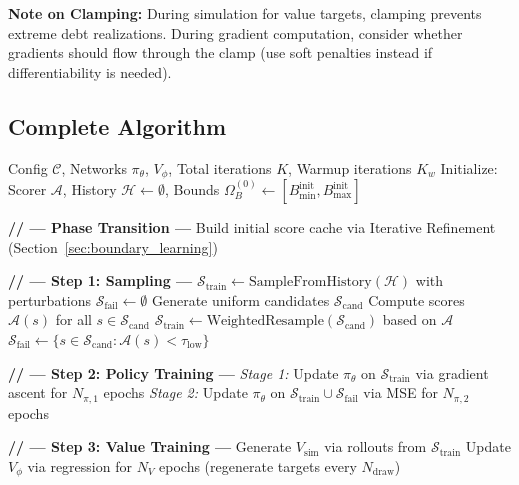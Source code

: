 \textbf{Note on Clamping:} During simulation for value targets, clamping prevents extreme debt realizations. During gradient computation, consider whether gradients should flow through the clamp (use soft penalties instead if differentiability is needed).


\subsection{Complete Algorithm}

\begin{algorithm}[H]
\caption{Deep Ramsey Algorithm with Adaptive Sampling}
\label{alg:main}
\begin{algorithmic}[1]
\Require Config $\mathcal{C}$, Networks $\pi_\theta$, $V_\phi$, Total iterations $K$, Warmup iterations $K_w$
\State Initialize: Scorer $\mathcal{A}$, History $\mathcal{H} \gets \emptyset$, Bounds $\Omega_B^{(0)} \gets [B_{\min}^{\text{init}}, B_{\max}^{\text{init}}]$

    \State \textbf{// --- Phase Transition ---}
        \State Build initial score cache via Iterative Refinement (Section~\ref{sec:boundary_learning})
    \EndIf
    
    \State
    \State \textbf{// --- Step 1: Sampling ---}
     
        \State $\mathcal{S}_{\text{train}} \gets \text{SampleFromHistory}(\mathcal{H})$ with perturbations
        \State $\mathcal{S}_{\text{fail}} \gets \emptyset$
    \Else {}
        \State Generate uniform candidates $\mathcal{S}_{\text{cand}}$
        \State Compute scores $\mathcal{A}(s)$ for all $s \in \mathcal{S}_{\text{cand}}$
        \State $\mathcal{S}_{\text{train}} \gets \text{WeightedResample}(\mathcal{S}_{\text{cand}})$ based on $\mathcal{A}$
        \State $\mathcal{S}_{\text{fail}} \gets \{s \in \mathcal{S}_{\text{cand}} : \mathcal{A}(s) < \tau_{\text{low}}\}$
    \EndIf
    
    \State
    \State \textbf{// --- Step 2: Policy Training ---}
    \State \textit{Stage 1:} Update $\pi_\theta$ on $\mathcal{S}_{\text{train}}$ via gradient ascent for $N_{\pi,1}$ epochs
        \State \textit{Stage 2:} Update $\pi_\theta$ on $\mathcal{S}_{\text{train}} \cup \mathcal{S}_{\text{fail}}$ via MSE for $N_{\pi,2}$ epochs
    \EndIf
    
    \State
    \State \textbf{// --- Step 3: Value Training ---}
    \State Generate $V_{\text{sim}}$ via rollouts from $\mathcal{S}_{\text{train}}$
    \State Update $V_\phi$ via regression for $N_V$ epochs (regenerate targets every $N_{\text{draw}}$)
    

\end{algorithmic}
\end{algorithm}
